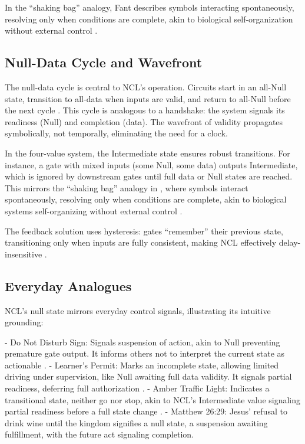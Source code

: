 \documentclass{article}
\begin{document}
In the ``shaking bag'' analogy, Fant describes symbols interacting spontaneously, resolving only when conditions are complete, akin to biological self-organization without external control \citep{fant2005, schneider2005}.

\subsection{Null-Data Cycle and Wavefront}
The null-data cycle is central to NCL's operation. Circuits start in an all-Null state, transition to all-data when inputs are valid, and return to all-Null before the next cycle \citep{fant2005}. This cycle is analogous to a handshake: the system signals its readiness (Null) and completion (data). The wavefront of validity propagates symbolically, not temporally, eliminating the need for a clock.

In the four-value system, the Intermediate state ensures robust transitions. For instance, a gate with mixed inputs (some Null, some data) outputs Intermediate, which is ignored by downstream gates until full data or Null states are reached. This mirrors the ``shaking bag'' analogy in \citet{fant2005}, where symbols interact spontaneously, resolving only when conditions are complete, akin to biological systems self-organizing without external control \citep{schneider2005}.

The feedback solution uses hysteresis: gates ``remember'' their previous state, transitioning only when inputs are fully consistent, making NCL effectively delay-insensitive \citep{fant2005}.

\subsection{Everyday Analogues}
NCL's null state mirrors everyday control signals, illustrating its intuitive grounding:

- Do Not Disturb Sign: Signals suspension of action, akin to Null preventing premature gate output. It informs others not to interpret the current state as actionable \citep{fant2005}.
- Learner's Permit: Marks an incomplete state, allowing limited driving under supervision, like Null awaiting full data validity. It signals partial readiness, deferring full authorization \citep{fant2005}.
- Amber Traffic Light: Indicates a transitional state, neither go nor stop, akin to NCL's Intermediate value signaling partial readiness before a full state change \citep{fant2005}.
- Matthew 26:29: Jesus' refusal to drink wine until the kingdom signifies a null state, a suspension awaiting fulfillment, with the future act signaling completion.
\end{document}
